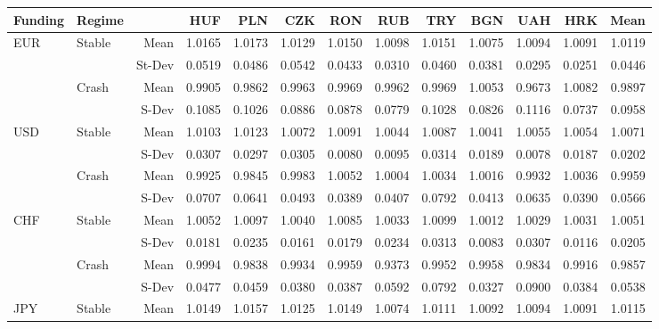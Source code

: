 \documentclass[12pt, a4paper, oneside]{article}\usepackage[]{graphicx}\usepackage[]{color}
\begin{document}
\begin{sidewaystable}[p]
\begin{threeparttable}
\centering
\begin{tabular}{llrrrrrrrrrrr}
  \hline
 Funding & Regime& & HUF & PLN & CZK & RON & RUB & TRY & BGN & UAH & HRK & Mean \\ 
  \hline
  \hline
\multirow{4}{*}{EUR}& \multirow{2}{*}{Stable}& Mean & 1.0165 & 1.0173 & 1.0129 & 1.0150 & 1.0098 & 1.0151 & 1.0075 & 1.0094 & 1.0091 & 1.0119 \\ 
&&St-Dev& 0.0519 & 0.0486 & 0.0542 & 0.0433 & 0.0310 & 0.0460 & 0.0381 & 0.0295 & 0.0251 & 0.0446 \\ 
&\multirow{2}{*}{Crash}& Mean & 0.9905 & 0.9862 & 0.9963 & 0.9969 & 0.9962 & 0.9969 & 1.0053 & 0.9673 & 1.0082 & 0.9897 \\ 
 &&S-Dev & 0.1085 & 0.1026 & 0.0886 & 0.0878 & 0.0779 & 0.1028 & 0.0826 & 0.1116 & 0.0737 & 0.0958 \\ 
\hline
\multirow{4}{*}{USD}&\multirow{2}{*}{Stable}&Mean& 1.0103 & 1.0123 & 1.0072 & 1.0091 & 1.0044 & 1.0087 & 1.0041 & 1.0055 & 1.0054 & 1.0071 \\ 
&&S-Dev& 0.0307 & 0.0297 & 0.0305 & 0.0080 & 0.0095 & 0.0314 & 0.0189 & 0.0078 & 0.0187 & 0.0202 \\ 
  &\multirow{2}{*}{Crash}&Mean& 0.9925 & 0.9845 & 0.9983 & 1.0052 & 1.0004 & 1.0034 & 1.0016 & 0.9932 & 1.0036 & 0.9959 \\ 
   & & S-Dev & 0.0707 & 0.0641 & 0.0493 & 0.0389 & 0.0407 & 0.0792 & 0.0413 & 0.0635 & 0.0390 & 0.0566 \\ 
\hline
\multirow{4}{*}{CHF}& \multirow{2}{*}{Stable}&Mean& 1.0052 & 1.0097 & 1.0040 & 1.0085 & 1.0033 & 1.0099 & 1.0012 & 1.0029 & 1.0031 & 1.0051 \\ 
   & & S-Dev & 0.0181 & 0.0235 & 0.0161 & 0.0179 & 0.0234 & 0.0313 & 0.0083 & 0.0307 & 0.0116 & 0.0205 \\ 
   & \multirow{2}{*}{Crash}& Mean & 0.9994 & 0.9838 & 0.9934 & 0.9959 & 0.9373 & 0.9952 & 0.9958 & 0.9834 & 0.9916 & 0.9857 \\ 
  & & S-Dev & 0.0477 & 0.0459 & 0.0380 & 0.0387 & 0.0592 & 0.0792 & 0.0327 & 0.0900 & 0.0384 & 0.0538 \\ 
\hline  
  \multirow{4}{*}{JPY}&\multirow{2}{*}{Stable}& Mean& 1.0149 & 1.0157 & 1.0125 & 1.0149 & 1.0074 & 1.0111 & 1.0092 & 1.0094 & 1.0091 & 1.0115 \\ 

\end{tabular}
\end{threeparttable}
\end{sidewaystable}
\end{document}
